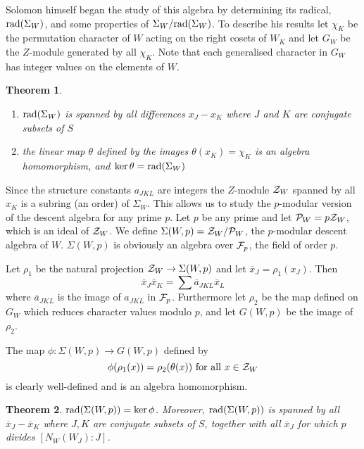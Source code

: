 \documentclass[10pt]{article}
\newtheorem{theorem}{Theorem}
\newcommand{\rad}{\textup{rad}}
\begin{document}
Solomon himself began the study of this algebra by determining its
radical, $\rad(\Sigma_{W})$, and some properties of
$\Sigma_{W}/\rad(\Sigma_{W})$.  To describe his results let $\chi_{K}$
be the permutation character of $W$ acting on the right cosets of
$W_{K}$ and let $G_{W}$ be the $Z$-module generated by all
$\chi_{K}$.  Note that each generalised character in $G_{W}$ has
integer values on the elements of $W$.

\begin{theorem} \cite{solomon-mackey}
\label{so-lomon2}
\begin{enumerate}
\item $\rad(\Sigma_{W})$ is spanned by all differences $x_{J}-x_{K}$
where $J$ and $K$ are conjugate subsets of $S$
\item the linear map $\theta$ defined by the images
$\theta(x_{K})=\chi_{K}$ is an algebra homomorphism, and
$\ker\theta=\rad(\Sigma_{W})$
\end{enumerate}
\end{theorem}

Since the structure constants $a_{JKL}$ are integers the $Z$-module
${\cal Z}_W$ spanned by all $x_{K}$ is a subring (an order) of
$\Sigma_{W}$.  This allows us to study the $p$-modular version of the
descent algebra for any prime $p$.  Let $p$ be any prime and let
${\cal P}_W=p{\cal Z}_W$, which is an ideal of ${\cal Z}_W$.
We define $\Sigma (W,p)={\cal Z}_W/{\cal P}_W$, the $p$-modular descent algebra
of  $W$.
$\Sigma (W,p)$ is obviously an algebra over ${\cal F}_{p}$, the field of order
$p$.

Let  $\rho_1$ be the natural projection ${\cal Z}_W\rightarrow
\Sigma(W,p)$
and let $\overline{x}_J=\rho_{1}(x_{J})$.  Then
$$\overline{x}_J\overline{x}_K=\sum\overline{a}_{JKL}\overline{x}_L$$
where $\overline{a}_{JKL}$ is the image of $a_{JKL}$ in ${\cal F}_{p}$.
Furthermore let $\rho_2$ be the map defined on $G_{W}$ which reduces
character values modulo $p$, and let $G(W,p)$ be the image of
$\rho_{2}$.

The map $\phi:\Sigma (W,p)\rightarrow G(W,p)$ defined by
$$ \phi(\rho_1(x))=\rho_2(\theta(x)) \mbox{ for all }x\in{\cal Z}_W$$
is clearly well-defined and is an algebra homomorphism.

 \begin{theorem}
 \label{ma-in2}
 $\rad(\Sigma(W,p))=\ker\phi$. Moreover, $\rad(\Sigma(W,p))$ is spanned by all
 $\overline{x}_J-\overline{x}_K$ where $J,K$ are conjugate subsets
 of $S$, together with all $\overline{x}_J$ for which $p$ divides
 $[N_{W}(W_{J}):J]$.
 \end{theorem}
\end{document}
